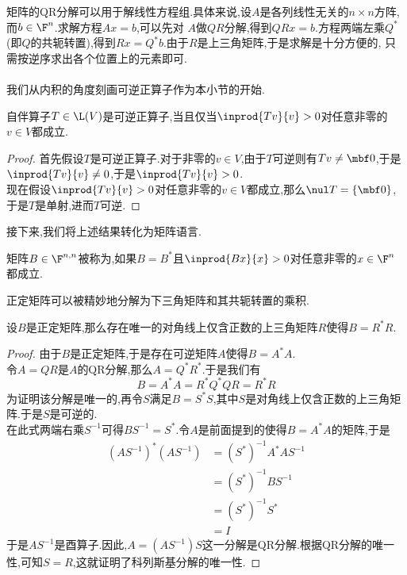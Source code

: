 \documentclass{ctexart}
\begin{document}
矩阵的QR分解可以用于解线性方程组.具体来说,设$A$是各列线性无关的$n\times n$方阵,而$b\in\F^n$.求解方程$Ax=b$,可以先对%
$A$做$QR$分解,得到$QRx=b$.方程两端左乘$Q^*$(即$Q$的共轭转置),得到$Rx=Q^*b$.由于$R$是上三角矩阵,于是求解是十分方便的,%
只需按逆序求出各个位置上的元素即可.\\
\\
我们从内积的角度刻画可逆正算子作为本小节的开始.
\begin{formal}[4.1 可逆正算子]
    自伴算子$T\in\L(V)$是可逆正算子,当且仅当$\inprod{Tv}{v}>0$对任意非零的$v\in V$都成立.
\end{formal}
\begin{proof}
    首先假设$T$是可逆正算子.对于非零的$v\in V$,由于$T$可逆则有$Tv\neq\mbf0$,于是$\inprod{Tv}{v}\neq0$,于是$\inprod{Tv}{v}>0$.\\
    现在假设$\inprod{Tv}{v}>0$对任意非零的$v\in V$都成立,那么$\nul T=\{\mbf0\}$,于是$T$是单射,进而$T$可逆.
\end{proof}\noindent
接下来,我们将上述结果转化为矩阵语言.
\begin{definition}[4.2 定义:正定矩阵]
    矩阵$B\in\F^{n,n}$被称为,如果$B=B^*$且$\inprod{Bx}{x}>0$对任意非零的$x\in\F^n$都成立.
\end{definition}\noindent
正定矩阵可以被精妙地分解为下三角矩阵和其共轭转置的乘积.
\begin{formal}[4.3 科列斯基分解]
    设$B$是正定矩阵,那么存在唯一的对角线上仅含正数的上三角矩阵$R$使得$B=R^*R$.
\end{formal}
\begin{proof}
    由于$B$是正定矩阵,于是存在可逆矩阵$A$使得$B=A^*A$.\\
    令$A=QR$是$A$的QR分解,那么$A=Q^*R^*$.于是我们有
    \[B=A^*A=R^*Q^*QR=R^*R\]
    为证明该分解是唯一的,再令$S$满足$B=S^*S$,其中$S$是对角线上仅含正数的上三角矩阵.于是$S$是可逆的.\\
    在此式两端右乘$S^{-1}$可得$BS^{-1}=S^*$.令$A$是前面提到的使得$B=A^*A$的矩阵,于是
    \[\begin{aligned}
        \left(AS^{-1}\right)^*\left(AS^{-1}\right)
        &= \left(S^*\right)^{-1}A^*AS^{-1} \\
        &= \left(S^*\right)^{-1}BS^{-1} \\
        &= \left(S^*\right)^{-1}S^* \\
        &= I
    \end{aligned}\]
    于是$AS^{-1}$是酉算子.因此,$A=\left(AS^{-1}\right)S$这一分解是QR分解.根据QR分解的唯一性,可知$S=R$,这就证明了科列斯基分解的唯一性.
\end{proof}
\end{document}
